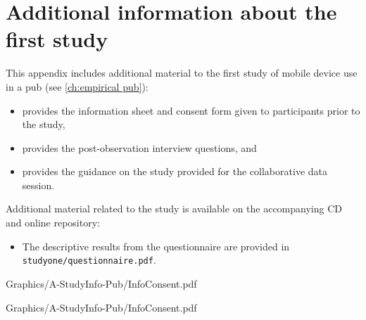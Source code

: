 


\chapter{Additional information about the first study}\label{app:studyinfo-pub}



This appendix includes additional material to the first study of mobile device use in a pub (see \autoref{ch:empirical pub}):

\begin{itemize}
    \item {} provides the information sheet and consent form given to participants prior to the study,
    \item {} provides the post-observation interview questions, and
    \item {} provides the guidance on the study provided for the collaborative data session.
\end{itemize}

Additional material related to the study is available on the accompanying CD and online repository:

\begin{itemize}
    \item The descriptive results from the questionnaire are provided in \texttt{studyone/questionnaire.pdf}.
\end{itemize}







    {Graphics/A-StudyInfo-Pub/InfoConsent.pdf}

    {Graphics/A-StudyInfo-Pub/InfoConsent.pdf}



